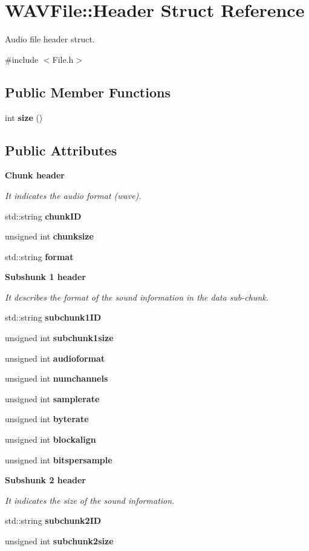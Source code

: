 \section{W\+A\+V\+File\+:\+:Header Struct Reference}
\label{struct_w_a_v_file_1_1_header}


Audio file header struct.  




{\ttfamily \#include $<$File.\+h$>$}

\subsection*{Public Member Functions}
\begin{DoxyCompactItemize}
\item 
int \textbf{ size} ()
\end{DoxyCompactItemize}
\subsection*{Public Attributes}
\begin{Indent}\textbf{ Chunk header}\par
{\em It indicates the audio format (wave). }\begin{DoxyCompactItemize}
\item 
std\+::string \textbf{ chunk\+ID}
\item 
unsigned int \textbf{ chunksize}
\item 
std\+::string \textbf{ format}
\end{DoxyCompactItemize}
\end{Indent}
\begin{Indent}\textbf{ Subshunk 1 header}\par
{\em It describes the format of the sound information in the data sub-\/chunk. }\begin{DoxyCompactItemize}
\item 
std\+::string \textbf{ subchunk1\+ID}
\item 
unsigned int \textbf{ subchunk1size}
\item 
unsigned int \textbf{ audioformat}
\item 
unsigned int \textbf{ numchannels}
\item 
unsigned int \textbf{ samplerate}
\item 
unsigned int \textbf{ byterate}
\item 
unsigned int \textbf{ blockalign}
\item 
unsigned int \textbf{ bitspersample}
\end{DoxyCompactItemize}
\end{Indent}
\begin{Indent}\textbf{ Subshunk 2 header}\par
{\em It indicates the size of the sound information. }\begin{DoxyCompactItemize}
\item 
std\+::string \textbf{ subchunk2\+ID}
\item 
unsigned int \textbf{ subchunk2size}
\end{DoxyCompactItemize}
\end{Indent}


